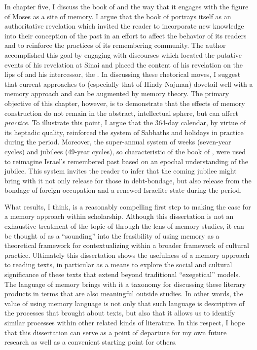 In chapter five, I discuss the book of \jub and the way that it engages with the figure of Moses as a site of memory. I argue that the book of \jub portrays itself as an authoritative revelation which invited the reader to incorporate new knowledge into their conception of the past in an effort to affect the behavior of its readers and to reinforce the practices of its remembering community. The author accomplished this goal by engaging with \Psgraphical discourses which located the putative events of his revelation at Sinai and placed the content of his revelation on the lips of \yahweh and his intercessor, the \ap. In discussing these rhetorical moves, I suggest that current approaches to \jub (especially that of Hindy Najman) dovetail well with a memory approach and can be augmented by memory theory. The primary objective of this chapter, however, is to demonstrate that the effects of memory construction do not remain in the abstract, intellectual sphere, but can affect \emph{practice}. To illustrate this point, I argue that the 364-day calendar, by virtue of its heptadic quality, reinforced the system of Sabbaths and holidays in practice during the \secondtemple period. Moreover, the super-annual system of weeks (seven-year cycles) and jubilees (49-year cycles), so characteristic of the book of \jub, were used to reimagine Israel's remembered past based on an epochal understanding of the jubilee. This system invites the reader to infer that the coming jubilee might bring with it not only release for those in debt-bondage, but also release from the bondage of foreign occupation and a renewed Israelite state during the \secondtemple period.

What results, I think, is a reasonably compelling first step to making the case for a memory approach within \rwb scholarship. Although this dissertation is not an exhaustive treatment of the topic of \rwb through the lens of memory studies, it can be thought of as a ``sounding'' into the feasibility of using memory as a theoretical framework for contextualizing \rwb within a broader framework of cultural practice. Ultimately this dissertation shows the usefulness of a memory approach to reading \rwb texts, in particular as a means to explore the social and cultural significance of these texts that extend beyond traditional ``exegetical'' models. The language of memory  brings with it a taxonomy for discussing these literary products in terms that are also meaningful outside \secondtemple studies. In other words, the value of using memory language is not only that such language is descriptive of the processes that brought about \rwb texts, but also that it allows us to identify similar processes within other related kinds of literature. In this respect, I hope that this dissertation can serve as a point of departure for my own future research as well as a convenient starting point for others. 